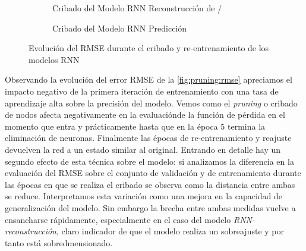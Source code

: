\begin{figure}[!ht]
  \centering
  \begin{subfigure}[b]{0.48\textwidth}
      \centering
      \caption{\footnotesize \label{fig:pruning:recon}Cribado del Modelo RNN Reconstrucción de \ifell/}
  \end{subfigure}
  \hfill
  \begin{subfigure}[b]{0.48\textwidth}
      \centering
      \caption{\footnotesize \label{fig:pruning:predict}Cribado del Modelo RNN Predicción}
  \end{subfigure}
  \caption{\label{fig:pruning:rmse} Evolución del RMSE durante el cribado y re-entrenamiento de los modelos RNN}
\end{figure}

Observando la evolución del error RMSE de la \autoref{fig:pruning:rmse} apreciamos el impacto negativo de la primera iteración de entrenamiento con una tasa de aprendizaje alta sobre la precisión del modelo. Vemos como el \textit{pruning} o cribado de nodos afecta negativamente en la evaluaciónde la función de pérdida en el momento que entra y prácticamente hasta que en la época 5 termina la eliminación de neuronas. Finalmente las épocas de re-entrenamiento y reajuste devuelven la red a un estado similar al original. Entrando en detalle hay un segundo efecto de esta técnica sobre el modelo: si analizamos la diferencia en la evaluación del RMSE sobre el conjunto de validación y de entrenamiento durante las épocas en que se realiza el cribado se observa como la distancia entre ambas se reduce. Interpretamos esta variación como una mejora en la capacidad de generalización del modelo. Sin embargo la brecha entre ambas medidas vuelve a ensancharse rápidamente, especialmente en el caso del modelo \textit{RNN-reconstrucción}, claro indicador de que el modelo realiza un sobreajuste y por tanto está sobredmensionado.



